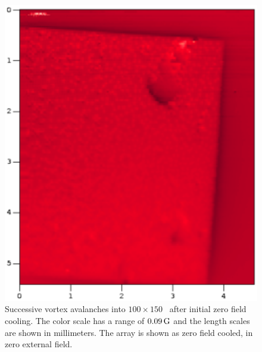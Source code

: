 %
%

\begin{figure}[p]
\includegraphics[width=5.7in]{figs/prospective/fig1_a_lg.ps}
\caption[Successive vortex avalanches in to \jja, zero field cooled.]
{Successive vortex avalanches into $100\times 150$ \jja\ after initial
zero field cooling. The color scale has a range of
$0.09\,\mathrm{G}$ and the length scales are shown in 
millimeters.
The array is shown as zero field cooled, in zero external field. 
}
\label{fig:initial_vortex_avalanche_a}
\end{figure}

